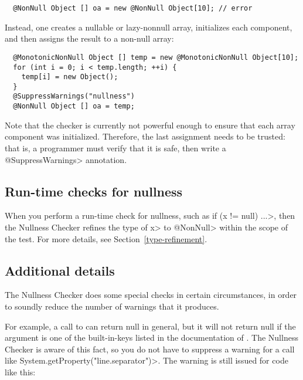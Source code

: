 \begin{Verbatim}
  @NonNull Object [] oa = new @NonNull Object[10]; // error
\end{Verbatim}

Instead, one creates a nullable or lazy-nonnull array, initializes
each component, and then assigns the result to a non-null array:

\begin{Verbatim}
  @MonotonicNonNull Object [] temp = new @MonotonicNonNull Object[10];
  for (int i = 0; i < temp.length; ++i) {
    temp[i] = new Object();
  }
  @SuppressWarnings("nullness")
  @NonNull Object [] oa = temp;
\end{Verbatim}

Note that the checker is currently not powerful enough to ensure that
each array component was initialized. Therefore, the last assignment
needs to be trusted:  that is, a programmer must verify that it is safe,
then write a \<@SuppressWarnings> annotation.



\subsection{Run-time checks for nullness\label{nullness-runtime-checks}}

When you perform a run-time check for nullness, such as \<if (x != null)
...>, then the Nullness Checker refines the type of \<x> to
\<@NonNull> within the scope of the test.  For more details, see
Section~\ref{type-refinement}.


\subsection{Additional details\label{nullness-additional-details}}

The Nullness Checker does some special checks in certain circumstances, in
order to soundly reduce the number of warnings that it produces.

For example, a call to 
can return null in general, but it will not return null if the argument is
one of the built-in-keys listed in the documentation of 
.
The Nullness Checker is aware of this fact, so you do not have to suppress
a warning for a call like \<System.getProperty("line.separator")>.  The
warning is still issued for code like this:

